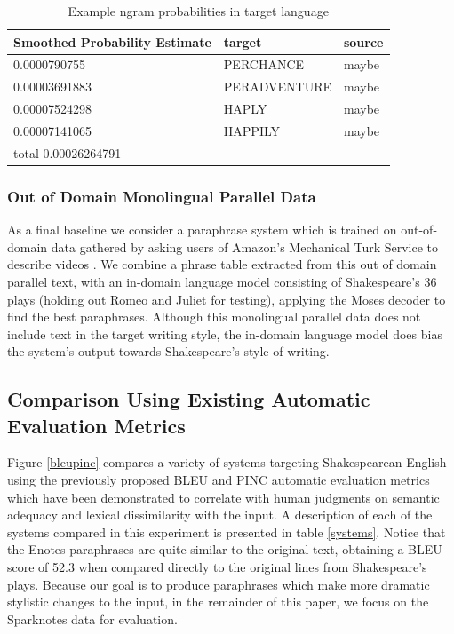 \documentclass[10pt,a5paper,twoside]{article}
\begin{document}
\begin{table}
  \begin{center}
  \begin{tabular}{|l|l|l|}
    \hline
    Smoothed Probability Estimate & target & source \\
    \hline
    \hline
    0.0000790755 & PERCHANCE & maybe \\
    \hline
    0.00003691883 & PERADVENTURE & maybe \\
    \hline
    0.00007524298 & HAPLY & maybe \\
    \hline
    0.00007141065 & HAPPILY & maybe \\
    \hline
    \hline
    total 0.00026264791 & & \\
    \hline
  \end{tabular}
  \end{center}
  \caption{Example ngram probabilities in target language}
  \label{word_frequency}
\end{table}

\subsubsection{Out of Domain Monolingual Parallel Data}
As a final baseline we consider a paraphrase system which is trained on out-of-domain data gathered by asking users of Amazon's Mechanical Turk Service 
\cite{Snow08} to describe videos \cite{chen11}.  We combine a phrase table extracted from this out of domain parallel text, with an in-domain
language model consisting of Shakespeare's 36 plays (holding out Romeo and Juliet for testing), applying the Moses decoder \cite{Koehn07} to find the best paraphrases. 
Although this monolingual parallel data does not include text in the target writing style,
the in-domain language model does bias the system's output towards Shakespeare's style of writing.

\subsection{Comparison Using Existing Automatic Evaluation Metrics}
Figure \ref{bleupinc} compares a variety of systems targeting Shakespearean English using the previously proposed BLEU \cite{Papineni02} and PINC \cite{chen11} automatic evaluation metrics which
have been demonstrated to correlate with human judgments on semantic adequacy and lexical dissimilarity with the input.
A description of each of the systems compared in this experiment is presented in table \ref{systems}.  Notice that the Enotes paraphrases are quite similar to the original text,
obtaining a BLEU score of 52.3 when compared directly to the original lines from Shakespeare's plays.  Because our goal is to produce paraphrases which make more dramatic stylistic changes to the input,
in the remainder of this paper, we focus on the Sparknotes data for evaluation.
\end{document}
